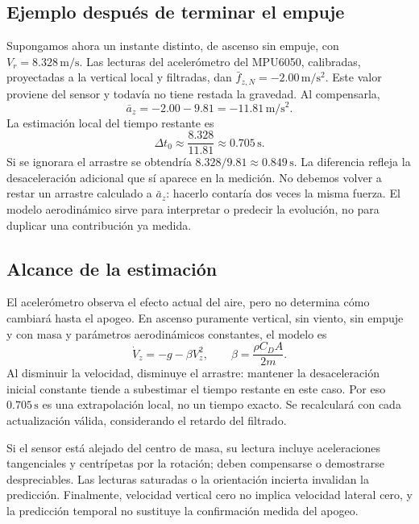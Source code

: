 \documentclass[11pt,a4paper]{article}
\begin{document}
\subsection{Ejemplo después de terminar el empuje}
Supongamos ahora un instante distinto, de ascenso sin empuje, con $V_r=8.328\,\mathrm{m/s}$. Las lecturas del acelerómetro del MPU6050, calibradas, proyectadas a la vertical local y filtradas, dan $\bar f_{z,N}=-2.00\,\mathrm{m/s^2}$. Este valor proviene del sensor y todavía no tiene restada la gravedad. Al compensarla,
\begin{equation}
 \bar a_z=-2.00-9.81=-11.81\,\mathrm{m/s^2}.
\end{equation}
La estimación local del tiempo restante es
\begin{equation}
 \Delta t_0\approx\frac{8.328}{11.81}\approx0.705\,\mathrm{s}.
\end{equation}
Si se ignorara el arrastre se obtendría $8.328/9.81\approx0.849\,\mathrm{s}$. La diferencia refleja la desaceleración adicional que sí aparece en la medición. No debemos volver a restar un arrastre calculado a $\bar a_z$: hacerlo contaría dos veces la misma fuerza. El modelo aerodinámico sirve para interpretar o predecir la evolución, no para duplicar una contribución ya medida.

\subsection{Alcance de la estimación}
El acelerómetro observa el efecto actual del aire, pero no determina cómo cambiará hasta el apogeo. En ascenso puramente vertical, sin viento, sin empuje y con masa y parámetros aerodinámicos constantes, el modelo es
\begin{equation}
 \dot V_z=-g-\beta V_z^2,\qquad \beta=\frac{\rho C_D A}{2m}.
\end{equation}
Al disminuir la velocidad, disminuye el arrastre: mantener la desaceleración inicial constante tiende a subestimar el tiempo restante en este caso. Por eso $0.705\,\mathrm{s}$ es una extrapolación local, no un tiempo exacto. Se recalculará con cada actualización válida, considerando el retardo del filtrado.

Si el sensor está alejado del centro de masa, su lectura incluye aceleraciones tangenciales y centrípetas por la rotación; deben compensarse o demostrarse despreciables. Las lecturas saturadas o la orientación incierta invalidan la predicción. Finalmente, velocidad vertical cero no implica velocidad lateral cero, y la predicción temporal no sustituye la confirmación medida del apogeo.
\end{document}
